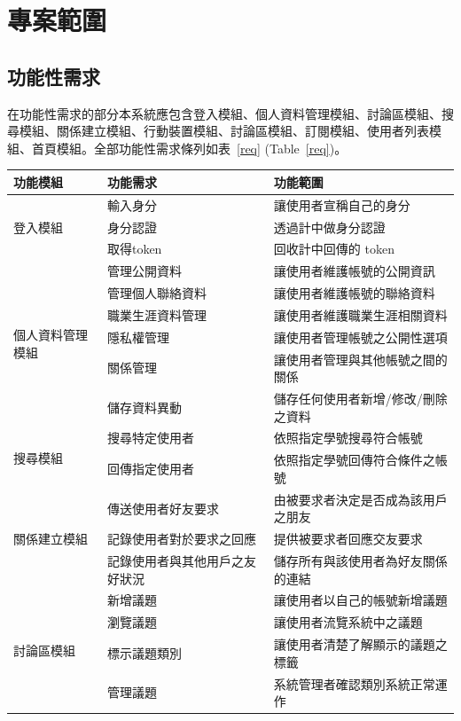 \documentclass[11pt]{article}
\begin{document}
\section{專案範圍}

\subsection{功能性需求}
在功能性需求的部分本系統應包含登入模組、個人資料管理模組、討論區模組、搜尋模組、關係建立模組、行動裝置模組、討論區模組、訂閱模組、使用者列表模組、首頁模組。全部功能性需求條列如表~\ref{req} (Table~\ref{req})。

\begin{table}[t]
\centering
\begin{tabular}{ | l | l | l | }
\hline
功能模組 & 功能需求 & 功能範圍 \\ \hline \hline
\multirow{3}{*}{登入模組} 
& 輸入身分 & 讓使用者宣稱自己的身分\\
& 身分認證 & 透過計中做身分認證 \\
& 取得token & 回收計中回傳的 token \\ \hline
\multirow{6}{*}{個人資料管理模組} 
& 管理公開資料 & 讓使用者維護帳號的公開資訊 \\
& 管理個人聯絡資料& 讓使用者維護帳號的聯絡資料\\
& 職業生涯資料管理& 讓使用者維護職業生涯相關資料 \\
& 隱私權管理& 讓使用者管理帳號之公開性選項 \\
& 關係管理& 讓使用者管理與其他帳號之間的關係 \\
& 儲存資料異動& 儲存任何使用者新增/修改/刪除之資料 \\ \hline
\multirow{2}{*}{搜尋模組} 
& 搜尋特定使用者 & 依照指定學號搜尋符合帳號 \\
& 回傳指定使用者 & 依照指定學號回傳符合條件之帳號 \\ \hline
 \multirow{3}{*}{關係建立模組} 
& 傳送使用者好友要求 & 由被要求者決定是否成為該用戶之朋友 \\ 
& 記錄使用者對於要求之回應 & 提供被要求者回應交友要求 \\
& 記錄使用者與其他用戶之友好狀況 & 儲存所有與該使用者為好友關係的連結 \\ \hline
\multirow{4}{*}{討論區模組}
& 新增議題 & 讓使用者以自己的帳號新增議題 \\
& 瀏覽議題 & 讓使用者流覽系統中之議題 \\
& 標示議題類別 & 讓使用者清楚了解顯示的議題之標籤 \\
& 管理議題 & 系統管理者確認類別系統正常運作 \\ \hline

\end{tabular}
\end{table}
\end{document}
